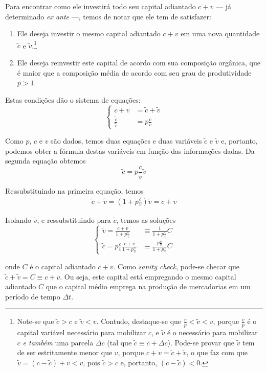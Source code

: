 Para encontrar como ele investirá todo seu capital adiantado $c+v$ — já determinado \textit{ex ante} —, temos de notar que ele tem de satisfazer:
\begin{enumerate}
\item Ele deseja investir o mesmo capital adiantado $c+v$ em uma nova quantidade $\tilde{c}$ e $\tilde{v}$.\footnote{Note-se que $\tilde{c}>c$ e $\tilde{v}<v$. Contudo, destaque-se que $\frac{v}{p}< \tilde{v} < v$, porque $\frac{v}{p}$ é o capital variável necessário para mobilizar $c$, e $\tilde{v}$ é o necessário para mobilizar $c$ \textit{e também} uma parcela $\Delta c$ (tal que $\tilde{c} \equiv c + \Delta c$). Pode-se provar que $\tilde{v}$ tem de ser estritamente menor que $v$, porque $c+v=\tilde{c}+\tilde{v}$, o que faz com que $\tilde{v}= (c-\tilde{c})+v<v$, pois $\tilde{c}>c$ e, portanto, $(c-\tilde{c})<0$.  } 
\item Ele deseja reinvestir este capital de acordo com sua composição orgânica, que é maior que a composição média de acordo com seu grau de produtividade $p>1$. 
\end{enumerate}

Estas condições dão o sistema de equações:
$$
\begin{cases}
c+v&=\tilde{c}+\tilde{v} \\
\frac{\tilde{c}}{\tilde{v}} &= p \frac{c}{v}
\end{cases}
$$

Como $p$, $c$ e $v$ são dados, temos duas equações e duas variáveis $\tilde{c}$ e $\tilde{v}$ e, portanto, podemos obter a fórmula destas variáveis em função das informações dadas. Da segunda equação obtemos
$$
\tilde{c} = p \frac{c}{v} \tilde{v}
$$

Ressubstituindo na primeira equação, temos
\begin{align*}
\tilde{c}+\tilde{v} = \left( 1+p \frac{c}{v} \right) \tilde{v} = c+v
\end{align*}

Isolando $\tilde{v}$, e ressubstituindo para $\tilde{c}$, temos as soluções
$$
\begin{cases}
\tilde{v} = \frac{c+v}{1+p \frac{c}{v}} &\equiv \frac{1}{1+p \frac{c}{v}} C \\
\tilde{c} = p \frac{c}{v} \frac{c+v}{1+p \frac{c}{v}} &\equiv \frac{p \frac{c}{v}}{1+p \frac{c}{v}} C
\end{cases}
$$

onde $C$ é o capital adiantado $c+v$. Como \textit{sanity check}, pode-se checar que $\tilde{c}+\tilde{v} = C \equiv c+v$. Ou seja, este capital está empregando o mesmo capital adiantado $C$ que o capital médio emprega na produção de mercadorias em um período de tempo $\Delta t$.

